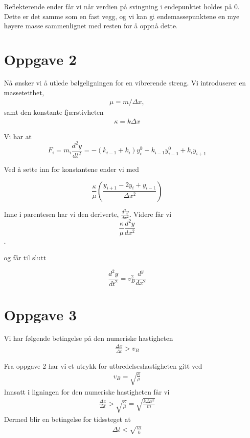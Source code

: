 \documentclass[norsk,a4,12pt,fleqn]{extarticle}
\begin{document}
Reflekterende ender får vi når verdien på svingning i endepunktet holdes på 0. 
Dette er det samme som en fast vegg, og vi kan gi endemassepunktene
en mye høyere masse sammenlignet med resten for å oppnå dette.

\section*{Oppgave 2}
Nå ønsker vi å utlede bølgeligningen for en vibrerende streng.
Vi introduserer en massetetthet, 
\begin{align}
    \mu = m/\Delta x, 
\end{align}
samt den konstante fjærstivheten
\begin{align} 
    \kappa = k\Delta x
\end{align}

Vi har at
\begin{equation*}
    F_i = m_i \frac{d^2y}{dt^2} = -(k_{i-1} + k_i)y_i^0 + k_{i-1}y_{i-1}^0 + k_iy_{i+1} 
\end{equation*}

Ved å sette inn for konstantene ender vi med

\begin{equation*}
    \frac{\kappa}{\mu} \left(\frac{y_{i+1}- 2y_i + y_{i-1}}{\Delta x^2}\right)
\end{equation*}

Inne i parentesen har vi den deriverte, \(\frac{d^2y}{dx^2}\).
Videre får vi
\begin{equation*}
    \frac{\kappa}{\mu} \frac{d^2y}{dx^2}
\end{equation*}. 

og får til slutt

\begin{equation*}
    \frac{d^2y}{dt^2} = v_B^2 \frac{d^y}{dx^2} 
\end{equation*}

\section*{Oppgave 3}
Vi har følgende betingelse på den 
numeriske hastigheten
\begin{align}
    \frac{\Delta x}{\Delta t} > v_B
\end{align}

Fra oppgave 2 har vi et utrykk for utbredelseshastigheten gitt ved
\begin{align}
    v_B = \sqrt{\frac{\kappa}{\mu}}
\end{align}
Innsatt i ligningen for den numeriske hastigheten får vi
\begin{align}
    \frac{\Delta x}{\Delta t} > \sqrt{\frac{\kappa}{\mu}} = \sqrt{\frac{k\Delta x^2}{m}}
\end{align}
Dermed blir en betingelse for tidssteget at
\begin{align}
    \Delta t < \sqrt{\frac{m}{k}}
\end{align}
\end{document}

